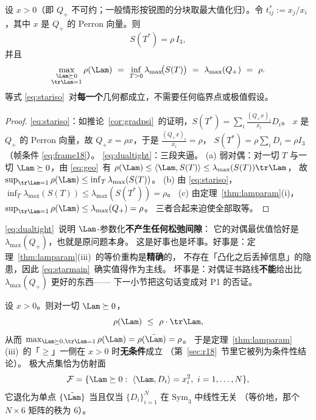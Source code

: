 \begin{theorem}[精确对偶]\label{thm:exactdual}
设 $x>0$（即 $Q_+$ 不可约；一般情形按锐图的分块取最大值化归）。令
$t^*_{ij}:=x_j/x_i$，其中 $x$ 是 $Q_+$ 的 Perron 向量。则
\begin{equation}\label{eq:stariso}
S(T^*)=\rho\,I_3 ,
\end{equation}
并且
\begin{equation}\label{eq:dualtight}
\max_{\substack{\Lam\succeq0\\ \tr\Lam=1}}\rho(\Lam)
\ =\ \inf_{T>0}\lambda_{\max}\!\bigl(S(T)\bigr)
\ =\ \lambda_{\max}(Q_+)\ =\ \rho .
\end{equation}
等式 \eqref{eq:stariso}~对\textbf{每一个}几何都成立，不需要任何临界点或极值假设。
\end{theorem}

\begin{proof}
\eqref{eq:stariso}：如推论~\ref{cor:gradpsi}~的证明，$S(T^*)=\sum_i\frac{(Q_+x)_i}{x_i}D_i$。
$x$ 是 $Q_+$ 的 Perron 向量，故 $Q_+x=\rho x$，于是 $\frac{(Q_+x)_i}{x_i}=\rho$，
$S(T^*)=\rho\sum_iD_i=\rho I_3$（帧条件 \eqref{eq:frame18}）。
\eqref{eq:dualtight}：三段夹逼。
(a) 弱对偶：对一切 $T$ 与一切 $\Lam\succeq0$，由 \eqref{eq:geo}~有
$\rho(\Lam)\le\langle\Lam,S(T)\rangle\le\lambda_{\max}(S(T))\tr\Lam$，
故 $\sup_{\tr\Lam=1}\rho(\Lam)\le\inf_T\lambda_{\max}(S(T))$。
(b) 由 \eqref{eq:stariso}，$\inf_T\lambda_{\max}(S(T))\le\lambda_{\max}(S(T^*))=\rho$。
(c) 由定理~\ref{thm:lamparam}(i)，$\sup_{\tr\Lam=1}\rho(\Lam)\le\lambda_{\max}(Q_+)=\rho$。
三者合起来迫使全部取等。
\end{proof}

\begin{remark}\label{rmk:dualtight}
\eqref{eq:dualtight}~说明 $\Lam$-参数化\textbf{不产生任何松弛间隙}：
它的对偶最优值恰好是 $\lambda_{\max}(Q_+)$，也就是原问题本身。
这是好事也是坏事。好事是：定理~\ref{thm:lamparam}(iii)~的等价重构是\textbf{精确}的，
不存在「凸化之后丢掉信息」的隐患，因此 \eqref{eq:starmain}~确实值得作为主线。
坏事是：对偶证书路线\textbf{不能}给出比 $\lambda_{\max}(Q_+)$ 更好的东西——
下一小节把这句话变成对 P1 的否证。
\end{remark}

\begin{corollary}\label{cor:argmax}
设 $x>0$。则对一切 $\Lam\succeq0$，
\begin{equation}\label{eq:tangent}
\rho(\Lam)\ \le\ \rho\cdot\tr\Lam ,
\end{equation}
从而 $\max_{\Lam\succeq0,\tr\Lam=1}\rho(\Lam)=\rho(\tilde\Lam)=\rho$。
于是定理~\ref{thm:lamparam}(iii)~的「$\ge$」一侧在 $x>0$ 时\textbf{无条件}成立
（第~\ref{sec:r18}~节里它被列为条件性结论）。
极大点集恰为仿射面
\begin{equation}\label{eq:face}
\mathcal F=\{\Lam\succeq0:\ \langle\Lam,D_i\rangle=x_i^2,\ i=1,\dots,N\},
\end{equation}
它退化为单点 $\{\tilde\Lam\}$ 当且仅当 $\{D_i\}_{i=1}^N$ 在 $\mathrm{Sym}_3$ 中线性无关
（等价地，那个 $N\times6$ 矩阵的秩为 $6$）。
\end{corollary}

